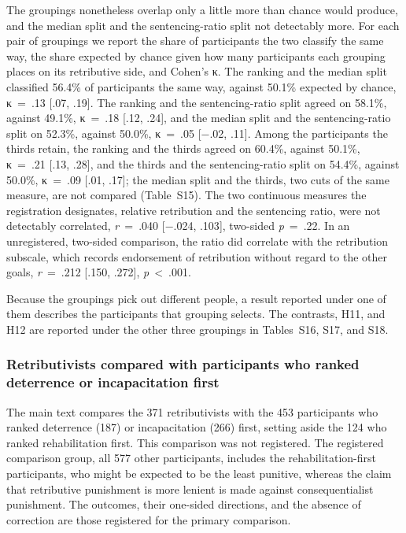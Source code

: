 The groupings nonetheless overlap only a little more than chance would produce, and the median split and the sentencing-ratio split not detectably more. For each pair of groupings we report the share of participants the two classify the same way, the share expected by chance given how many participants each grouping places on its retributive side, and Cohen's κ. The ranking and the median split classified 56.4\% of participants the same way, against 50.1\% expected by chance, κ~=~.13 {[}.07, .19{]}. The ranking and the sentencing-ratio split agreed on 58.1\%, against 49.1\%, κ~=~.18 {[}.12, .24{]}, and the median split and the sentencing-ratio split on 52.3\%, against 50.0\%, κ~=~.05 {[}−.02, .11{]}. Among the participants the thirds retain, the ranking and the thirds agreed on 60.4\%, against 50.1\%, κ~=~.21 {[}.13, .28{]}, and the thirds and the sentencing-ratio split on 54.4\%, against 50.0\%, κ~=~.09 {[}.01, .17{]}; the median split and the thirds, two cuts of the same measure, are not compared (Table~S15). The two continuous measures the registration designates, relative retribution and the sentencing ratio, were not detectably correlated, \emph{r}~=~.040 {[}−.024, .103{]}, two-sided \emph{p}~=~.22. In an unregistered, two-sided comparison, the ratio did correlate with the retribution subscale, which records endorsement of retribution without regard to the other goals, \emph{r}~=~.212 {[}.150, .272{]}, \emph{p}~\textless{}~.001.

Because the groupings pick out different people, a result reported under one of them describes the participants that grouping selects. The contrasts, H11, and H12 are reported under the other three groupings in Tables~S16, S17, and S18.

\subsubsection{Retributivists compared with participants who ranked deterrence or incapacitation first}\label{retributivists-compared-with-participants-who-ranked-deterrence-or-incapacitation-first}

The main text compares the 371 retributivists with the 453 participants who ranked deterrence (187) or incapacitation (266) first, setting aside the 124 who ranked rehabilitation first. This comparison was not registered. The registered comparison group, all 577 other participants, includes the rehabilitation-first participants, who might be expected to be the least punitive, whereas the claim that retributive punishment is more lenient is made against consequentialist punishment. The outcomes, their one-sided directions, and the absence of correction are those registered for the primary comparison.

